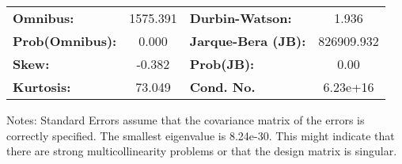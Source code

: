 \begin{center}
\begin{tabular}{lcccccc}
\bottomrule
\end{tabular}
\begin{tabular}{lclc}
\textbf{Omnibus:}       & 1575.391 & \textbf{  Durbin-Watson:     } &     1.936   \\
\textbf{Prob(Omnibus):} &   0.000  & \textbf{  Jarque-Bera (JB):  } & 826909.932  \\
\textbf{Skew:}          &  -0.382  & \textbf{  Prob(JB):          } &      0.00   \\
\textbf{Kurtosis:}      &  73.049  & \textbf{  Cond. No.          } &  6.23e+16   \\
\bottomrule
\end{tabular}
\end{center}

Notes: \newline
 [1] Standard Errors assume that the covariance matrix of the errors is correctly specified. \newline
 [2] The smallest eigenvalue is 8.24e-30. This might indicate that there are \newline
 strong multicollinearity problems or that the design matrix is singular.